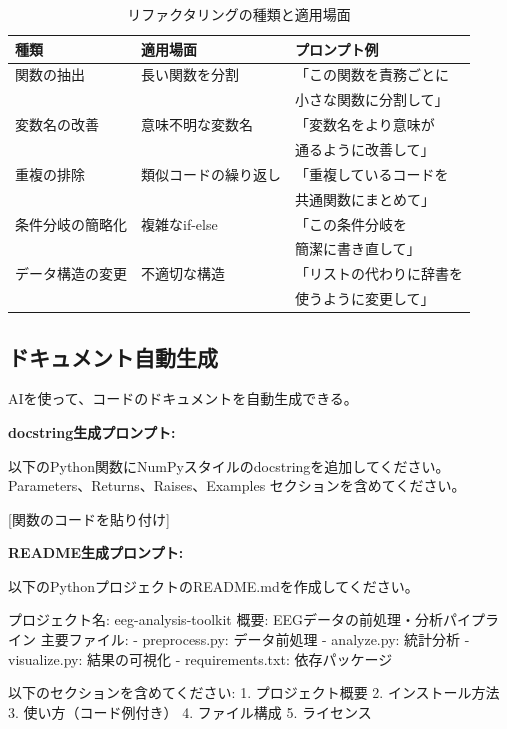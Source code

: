 \begin{table}[htbp]
\centering
\caption{リファクタリングの種類と適用場面}
\label{tab:refactoring}
\footnotesize
\begin{tabular}{lll}
\toprule
種類 & 適用場面 & プロンプト例 \\
\midrule
関数の抽出 & 長い関数を分割 & 「この関数を責務ごとに \\
 & & 小さな関数に分割して」 \\
変数名の改善 & 意味不明な変数名 & 「変数名をより意味が \\
 & & 通るように改善して」 \\
重複の排除 & 類似コードの繰り返し & 「重複しているコードを \\
 & & 共通関数にまとめて」 \\
条件分岐の簡略化 & 複雑なif-else & 「この条件分岐を \\
 & & 簡潔に書き直して」 \\
データ構造の変更 & 不適切な構造 & 「リストの代わりに辞書を \\
 & & 使うように変更して」 \\
\bottomrule
\end{tabular}
\end{table}

\subsection{ドキュメント自動生成}

AIを使って、コードのドキュメントを自動生成できる。

\textbf{docstring生成プロンプト:}

\begin{promptbox}
以下のPython関数にNumPyスタイルのdocstringを追加してください。
Parameters、Returns、Raises、Examples セクションを含めてください。

{[}関数のコードを貼り付け]
\end{promptbox}

\textbf{README生成プロンプト:}

\begin{promptbox}
以下のPythonプロジェクトのREADME.mdを作成してください。

プロジェクト名: eeg-analysis-toolkit
概要: EEGデータの前処理・分析パイプライン
主要ファイル:
- preprocess.py: データ前処理
- analyze.py: 統計分析
- visualize.py: 結果の可視化
- requirements.txt: 依存パッケージ

以下のセクションを含めてください:
1. プロジェクト概要
2. インストール方法
3. 使い方（コード例付き）
4. ファイル構成
5. ライセンス
\end{promptbox}

